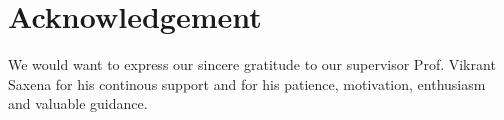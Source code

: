 \documentclass[12pt]{article}
\newenvironment{changemargin}[2]{%
\begin{list}{}{%
\setlength{\topsep}{0pt}%
\setlength{\leftmargin}{#1}%
\setlength{\rightmargin}{#2}%
\setlength{\listparindent}{\parindent}%
\setlength{\itemindent}{\parindent}%
\setlength{\parsep}{\parskip}%
}%
\item[]}{\end{list}}
\begin{document}
\begin{changemargin}{-2cm}{-2cm}
    \section{Acknowledgement}
    We would want to express our sincere gratitude to our supervisor Prof. Vikrant Saxena for his continous support and for his patience, motivation, enthusiasm and valuable guidance.

    \printbibliography
\end{changemargin}
\end{document}
